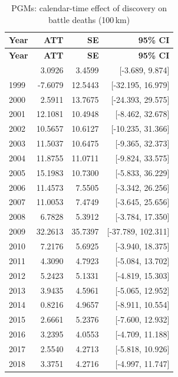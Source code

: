 \begin{longtable}{lrrr}
\caption{PGMs: calendar-time effect of discovery on battle deaths (100\,km)} \label{tab:cal_pgms} \\
\toprule
\textbf{Year} & \textbf{ATT} & \textbf{SE} & \textbf{95\% CI} \\
\midrule \endfirsthead
\toprule
\textbf{Year} & \textbf{ATT} & \textbf{SE} & \textbf{95\% CI} \\
\midrule \endhead
\bottomrule \endlastfoot
1998 & 3.0926 & 3.4599 & [-3.689, 9.874] \\
1999 & -7.6079 & 12.5443 & [-32.195, 16.979] \\
2000 & 2.5911 & 13.7675 & [-24.393, 29.575] \\
2001 & 12.1081 & 10.4948 & [-8.462, 32.678] \\
2002 & 10.5657 & 10.6127 & [-10.235, 31.366] \\
2003 & 11.5037 & 10.6475 & [-9.365, 32.373] \\
2004 & 11.8755 & 11.0711 & [-9.824, 33.575] \\
2005 & 15.1983 & 10.7300 & [-5.833, 36.229] \\
2006 & 11.4573 & 7.5505 & [-3.342, 26.256] \\
2007 & 11.0053 & 7.4749 & [-3.645, 25.656] \\
2008 & 6.7828 & 5.3912 & [-3.784, 17.350] \\
2009 & 32.2613 & 35.7397 & [-37.789, 102.311] \\
2010 & 7.2176 & 5.6925 & [-3.940, 18.375] \\
2011 & 4.3090 & 4.7923 & [-5.084, 13.702] \\
2012 & 5.2423 & 5.1331 & [-4.819, 15.303] \\
2013 & 3.9435 & 4.5961 & [-5.065, 12.952] \\
2014 & 0.8216 & 4.9657 & [-8.911, 10.554] \\
2015 & 2.6661 & 5.2376 & [-7.600, 12.932] \\
2016 & 3.2395 & 4.0553 & [-4.709, 11.188] \\
2017 & 2.5540 & 4.2713 & [-5.818, 10.926] \\
2018 & 3.3751 & 4.2716 & [-4.997, 11.747] \\
\end{longtable}

